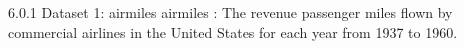 6.0.1 Dataset 1: airmiles
airmiles : The revenue passenger miles flown by commercial airlines in the United States for each year from 1937 to 1960.